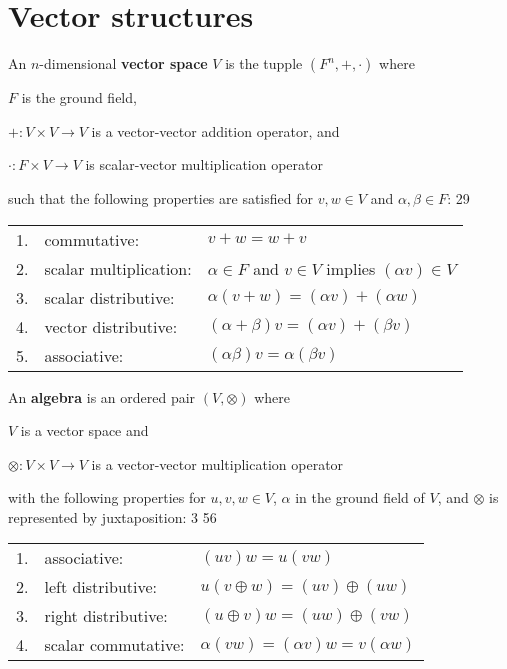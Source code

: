 \section{Vector structures}
\begin{definition}
An $n$-dimensional {\bf vector space} $V$ is the tupple $(F^n,+,\cdot)$
where 
\begin{liste}
   \item $F$ is the ground field,
   \item $+:V\times V\to V$ is a vector-vector addition operator, and 
   \item $\cdot:F\times V\to V$ is scalar-vector multiplication operator 
\end{liste}
such that the following properties are satisfied
for $v,w\in V$ and $\alpha,\beta\in F$: \citep{wicker}{29}

\begin{tabular}{lll}
   1. & commutative:           & $v+w = w+v$                                           \\
   2. & scalar multiplication: & $\alpha\in F$ and $v\in V$ implies $(\alpha v)\in V$  \\
   3. & scalar distributive:   & $\alpha(v+w)=(\alpha v)+(\alpha w)$                   \\
   4. & vector distributive:   & $(\alpha+\beta)v =(\alpha v)+(\beta v)$                \\
   5. & associative:           & $(\alpha\beta)v = \alpha(\beta v)$
\end{tabular}
\end{definition}


\begin{definition}
An {\bf algebra} is an ordered pair $(V,\otimes)$ where 
\begin{liste}
   \item $V$ is a vector space and 
   \item $\otimes:V\times V\to V$ is a vector-vector multiplication operator
\end{liste}
with the following properties for $u,v,w\in V$,
$\alpha$ in the ground field of $V$,
and $\otimes$ is represented by juxtaposition:
\citep{aa}{3} \citep{michel}{56}

\begin{tabular}{lll}
   1. & associative:        & $ (uv)w = u(vw)            $ \\
   2. & left distributive:  & $ u( v \oplus w) = (uv) \oplus (uw) $ \\
   3. & right distributive: & $ ( u \oplus v)w = (uw) \oplus (vw) $ \\
   4. & scalar commutative: & $ \alpha(vw) = (\alpha v)w = v (\alpha w)                      $
\end{tabular}
\end{definition}








